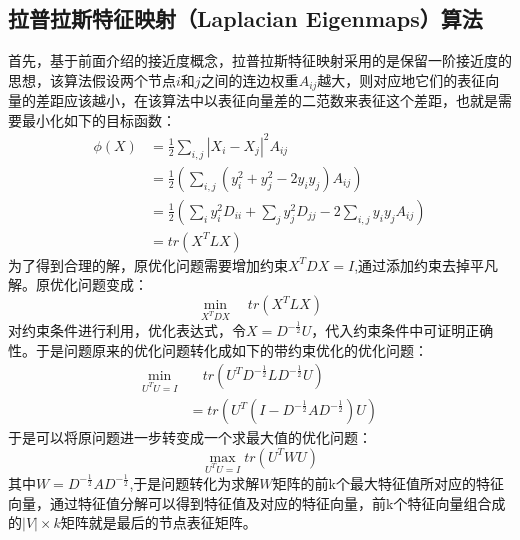 \subsection{拉普拉斯特征映射（Laplacian Eigenmaps）算法}
首先，基于前面介绍的接近度概念，拉普拉斯特征映射采用的是保留一阶接近度的思想，该算法假设两个节点$i$和$j$之间的连边权重$A_{ij}$越大，则对应地它们的表征向量的差距应该越小，在该算法中以表征向量差的二范数来表征这个差距，也就是需要最小化如下的目标函数：
\begin{equation}
\begin{aligned}
\phi(X) &= \frac{1}{2}\sum_{i,j}|X_i - X_j|^2A_{ij} \\
&= \frac{1}{2}(\sum_{i,j}(y_i^2+y_j^2-2y_iy_j) A_{ij}) \\
&=\frac{1}{2} (\sum_iy_i^2D_{ii} +\sum_j y_j^2 D_{jj} - 2\sum_{i,j}y_i y_j A_{ij}) \\
&= tr(X^TLX)
\end{aligned}
\end{equation}
为了得到合理的解，原优化问题需要增加约束$X^TDX=I$,通过添加约束去掉平凡解。原优化问题变成：
\begin{equation}
\min_{X^TDX} \quad tr(X^TLX)
\end{equation}
对约束条件进行利用，优化表达式，令$X=D^{-\frac{1}{2}}U$，代入约束条件中可证明正确性。于是问题原来的优化问题转化成如下的带约束优化的优化问题：
\begin{equation}
\begin{aligned}
\min_{U^TU = I} &\quad tr(U^TD^{-\frac{1}{2}}LD^{-\frac{1}{2}}U) \\
&= tr(U^T(I-D^{-\frac{1}{2}}AD^{-\frac{1}{2}})U)
\end{aligned}
\end{equation}
于是可以将原问题进一步转变成一个求最大值的优化问题：
\begin{equation}
\max_{U^TU = I} tr(U^TWU)
\end{equation}
其中$W = D^{-\frac{1}{2}}AD^{-\frac{1}{2}} $,于是问题转化为求解$W$矩阵的前k个最大特征值所对应的特征向量，通过特征值分解可以得到特征值及对应的特征向量，前k个特征向量组合成的$|V|\times k$矩阵就是最后的节点表征矩阵。

